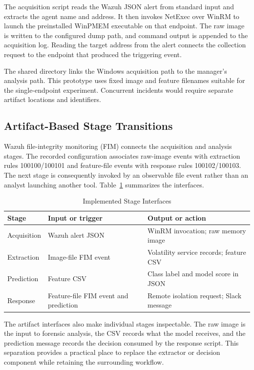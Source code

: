 \documentclass[conference]{IEEEtran}
\begin{document}
The acquisition script reads the Wazuh JSON alert from standard input and extracts the agent name and address. It then invokes NetExec over WinRM to launch the preinstalled WinPMEM executable on that endpoint. The raw image is written to the configured dump path, and command output is appended to the acquisition log. Reading the target address from the alert connects the collection request to the endpoint that produced the triggering event.

The shared directory links the Windows acquisition path to the manager's analysis path. 
This prototype uses fixed image and feature filenames suitable for the single-endpoint experiment. Concurrent incidents would require separate artifact locations and identifiers.

\subsection{Artifact-Based Stage Transitions}
Wazuh file-integrity monitoring (FIM) connects the acquisition and analysis stages. The recorded configuration associates raw-image events with extraction rules 100100/100101 and feature-file events with response rules 100102/100103. The next stage is consequently invoked by an observable file event rather than an analyst launching another tool. Table~\ref{tab:interfaces} summarizes
the interfaces.

\begin{table}[t]
\caption{Implemented Stage Interfaces}
\label{tab:interfaces}
\centering
\footnotesize
\begin{tabular}{@{}p{1.45cm}p{2.85cm}p{3.55cm}@{}}
\toprule
Stage & Input or trigger & Output or action \\
\midrule
Acquisition & Wazuh alert JSON & WinRM invocation; raw memory image \\
Extraction & Image-file FIM event & Volatility service records; feature CSV \\
Prediction & Feature CSV & Class label and model score in JSON \\
Response & Feature-file FIM event and prediction & Remote isolation request; Slack message \\
\bottomrule
\end{tabular}
\end{table}

The artifact interfaces also make individual stages inspectable. The raw image is the input to forensic analysis, the CSV records what the model receives, and the prediction message records the decision consumed by the response script. This separation provides a practical place to replace the extractor or decision component while retaining the surrounding workflow.
\end{document}
